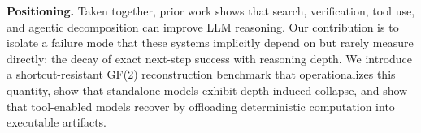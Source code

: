 \documentclass{article}
\begin{document}
\textbf{Positioning.\enspace}
Taken together, prior work shows that search, verification, tool use, and agentic decomposition can improve LLM reasoning. Our contribution is to isolate a failure mode that these systems implicitly depend on but rarely measure directly: the decay of exact next-step success with reasoning depth. We introduce a shortcut-resistant GF(2) reconstruction benchmark that operationalizes this quantity, show that standalone models exhibit depth-induced collapse, and show that tool-enabled models recover by offloading deterministic computation into executable artifacts.



\end{document}
